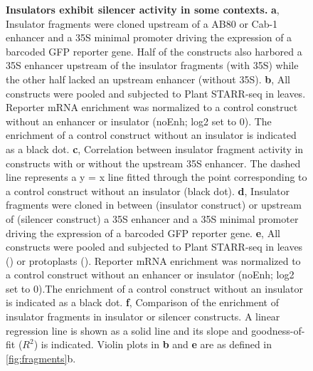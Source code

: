 \documentclass[10pt]{article}
\newcommand{\fignormal}{\scriptsize} %
\newcommand{\usename}[1]{\csname#1\endcsname}
\newif\ifnpc
\newcounter{fig}
\newenvironment{fig}{%
	\begin{figure}[p]%
		\stepcounter{fig}%
		\pdfbookmark{\figurename\ \thefig}{figure\thefig}
		\tikzsetnextfilename{figure\thefig}%
		\fignormal%
		\centering%
}{%
	\end{figure}%
	\clearpage%
	\ifnpc%
		\makenextpagecaption%
		\global\npcfalse%
	\fi%
}
\newcounter{efig}
\newcommand{\titleend}{ }
\newcommand{\nextentry}{ }
\newcommand{\captiontitle}[2][]{\textbf{#2.}\titleend}
\newif\ifsubfigupper
\newcounter{subfig}[figure]
\newcommand{\subfigrefsep}{,}
\newcommand{\subfigunformatted}[1]{\ifsubfigupper\uppercase{#1}\else\lowercase{#1}\fi}
\newcommand{\plainsubfigref}[1]{\textbf{\subfigunformatted{#1}}}
\newcommand{\subfig}[1]{\plainsubfigref{#1}\subfigrefsep}
\begin{document}
		\begin{fig}
			\caption{%
				\captiontitle{Insulators exhibit silencer activity in some contexts}%
				\subfig{A} Insulator fragments were cloned upstream of a \usename{AB80} or \usename{Cab-1} enhancer and a 35S minimal promoter driving the expression of a barcoded GFP reporter gene. Half of the constructs also harbored a \usename{35S} enhancer upstream of the insulator fragments (with \usename{35S}) while the other half lacked an upstream enhancer (without \usename{35S}).\nextentry
				\subfig{B} All constructs were pooled and subjected to Plant STARR-seq in \tobacco leaves. Reporter mRNA enrichment was normalized to a control construct without an enhancer or insulator (noEnh; log2 set to 0). The enrichment of a control construct without an insulator is indicated as a black dot.\nextentry
				\subfig{C}  Correlation between insulator fragment activity in constructs with or without the upstream \usename{35S} enhancer. The dashed line represents a y = x line fitted through the point corresponding to a control construct without an insulator (black dot).\nextentry
				\subfig{D} Insulator fragments were cloned in between (insulator construct) or upstream of (silencer construct) a \usename{35S} enhancer and a 35S minimal promoter driving the expression of a barcoded GFP reporter gene.
				\subfig{E} All constructs were pooled and subjected to Plant STARR-seq in \tobacco leaves (\tobacco) or \maize protoplasts (\maize). Reporter mRNA enrichment was normalized to a control construct without an enhancer or insulator (noEnh; log2 set to 0).The enrichment of a control construct without an insulator is indicated as a black dot.\nextentry
				\subfig{F} Comparison of the enrichment of insulator fragments in insulator or silencer constructs. A linear regression line is shown as a solid line and its slope and goodness-of-fit ($R^2$) is indicated.\nextentry
				Violin plots in \plainsubfigref{B} and \plainsubfigref{E} are as defined in \cref{fig:fragments}\subfigunformatted{B}.
			}%
			\label{fig:silencer}%
		\end{fig}
		
\end{document}
